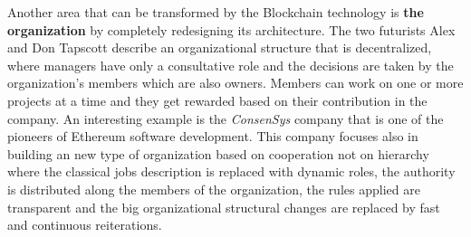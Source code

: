 Another area that can be transformed by the Blockchain technology is \textbf{the organization} by completely redesigning its architecture. The two futurists Alex and Don Tapscott describe an organizational structure that is decentralized, where managers have only a consultative role and the decisions are taken by the organization's members which are also owners. Members can work on one or more projects at a time and they get rewarded based on their contribution in the company. An interesting example is the \emph{ConsenSys} company that is one of the pioneers of Ethereum software development. This company focuses also in building an new type of organization based on cooperation not on hierarchy where the classical jobs description is replaced with dynamic roles, the authority is distributed along the members of the organization, the rules applied are transparent and the big organizational structural changes are replaced by fast and continuous reiterations.


